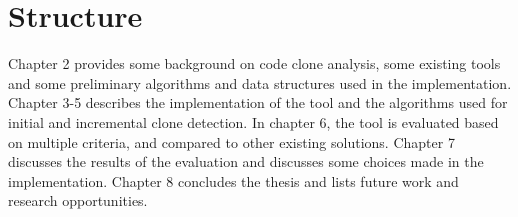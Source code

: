 \section{Structure}

Chapter 2 provides some background on code clone analysis, some existing tools and some
preliminary algorithms and data structures used in the implementation. Chapter 3-5
describes the implementation of the tool and the algorithms used for initial and
incremental clone detection. In chapter 6, the tool is evaluated based on multiple
criteria, and compared to other existing solutions. Chapter 7 discusses the results of the
evaluation and discusses some choices made in the implementation. Chapter 8 concludes the
thesis and lists future work and research opportunities.
